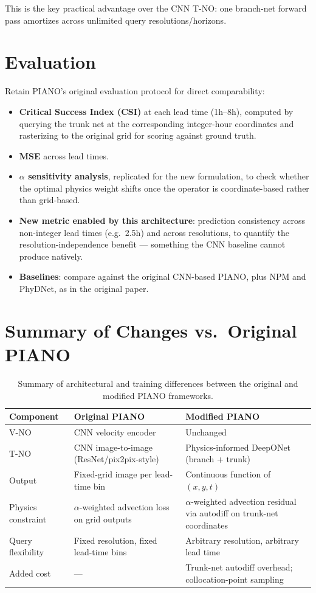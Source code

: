 \documentclass[11pt]{article}
\begin{document}
This is the key practical advantage over the CNN T-NO: one branch-net forward pass amortizes across unlimited query resolutions/horizons.

\section{Evaluation}

Retain PIANO's original evaluation protocol for direct comparability:

\begin{itemize}
    \item \textbf{Critical Success Index (CSI)} at each lead time (1h--8h), computed by querying the trunk net at the corresponding integer-hour coordinates and rasterizing to the original grid for scoring against ground truth.
    \item \textbf{MSE} across lead times.
    \item \textbf{$\alpha$ sensitivity analysis}, replicated for the new formulation, to check whether the optimal physics weight shifts once the operator is coordinate-based rather than grid-based.
    \item \textbf{New metric enabled by this architecture}: prediction consistency across non-integer lead times (e.g.\ 2.5h) and across resolutions, to quantify the resolution-independence benefit --- something the CNN baseline cannot produce natively.
    \item \textbf{Baselines}: compare against the original CNN-based PIANO, plus NPM and PhyDNet, as in the original paper.
\end{itemize}

\section{Summary of Changes vs.\ Original PIANO}

\begin{table}[htbp]
\centering
\begin{tabular}{@{}p{3.1cm}p{4.6cm}p{5.8cm}@{}}
\toprule
\textbf{Component} & \textbf{Original PIANO} & \textbf{Modified PIANO} \\
\midrule
V-NO & CNN velocity encoder & Unchanged \\
T-NO & CNN image-to-image (ResNet/pix2pix-style) & Physics-informed DeepONet (branch + trunk) \\
Output & Fixed-grid image per lead-time bin & Continuous function of $(x,y,t)$ \\
Physics constraint & $\alpha$-weighted advection loss on grid outputs & $\alpha$-weighted advection residual via autodiff on trunk-net coordinates \\
Query flexibility & Fixed resolution, fixed lead-time bins & Arbitrary resolution, arbitrary lead time \\
Added cost & --- & Trunk-net autodiff overhead; collocation-point sampling \\
\bottomrule
\end{tabular}
\caption{Summary of architectural and training differences between the original and modified PIANO frameworks.}
\end{table}
\end{document}
